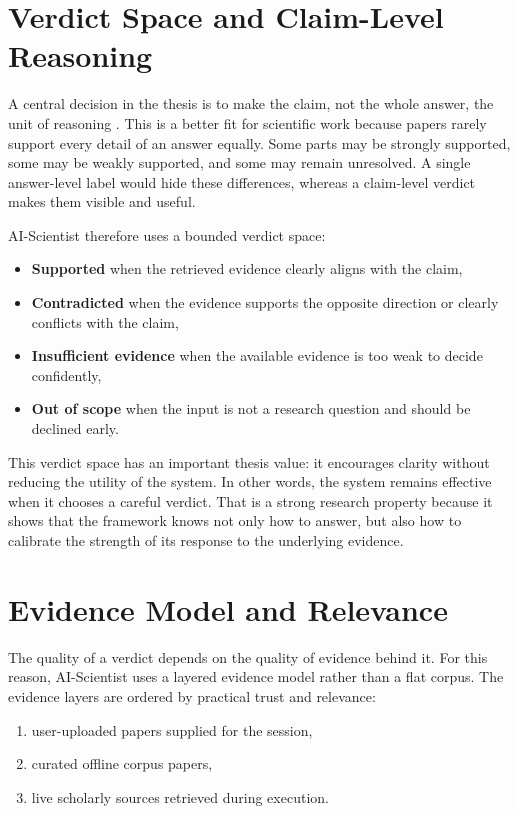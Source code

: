 \section{Verdict Space and Claim-Level Reasoning}

A central decision in the thesis is to make the claim, not the whole answer, the unit of reasoning \cite{honovich2022true,min2023factscore}. This is a better fit for scientific work because papers rarely support every detail of an answer equally. Some parts may be strongly supported, some may be weakly supported, and some may remain unresolved. A single answer-level label would hide these differences, whereas a claim-level verdict makes them visible and useful.

AI-Scientist therefore uses a bounded verdict space:
\begin{itemize}[leftmargin=*]
    \item \textbf{Supported} when the retrieved evidence clearly aligns with the claim,
    \item \textbf{Contradicted} when the evidence supports the opposite direction or clearly conflicts with the claim,
    \item \textbf{Insufficient evidence} when the available evidence is too weak to decide confidently,
    \item \textbf{Out of scope} when the input is not a research question and should be declined early.
\end{itemize}

This verdict space has an important thesis value: it encourages clarity without reducing the utility of the system. In other words, the system remains effective when it chooses a careful verdict. That is a strong research property because it shows that the framework knows not only how to answer, but also how to calibrate the strength of its response to the underlying evidence.

\section{Evidence Model and Relevance}

The quality of a verdict depends on the quality of evidence behind it. For this reason, AI-Scientist uses a layered evidence model rather than a flat corpus. The evidence layers are ordered by practical trust and relevance:
\begin{enumerate}[leftmargin=*]
    \item user-uploaded papers supplied for the session,
    \item curated offline corpus papers,
    \item live scholarly sources retrieved during execution.
\end{enumerate}

